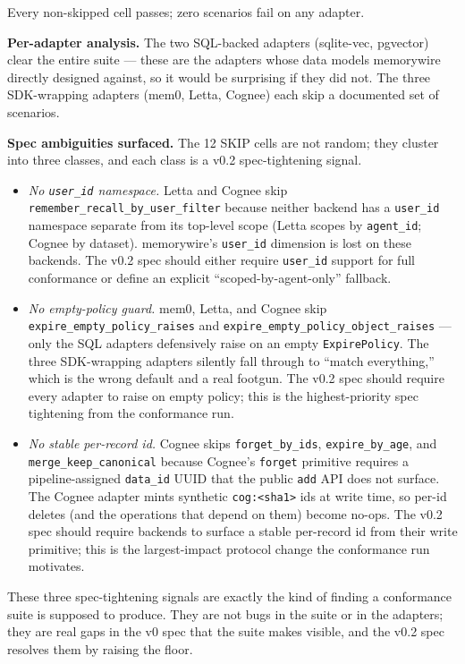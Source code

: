 \documentclass[11pt,letterpaper,twocolumn]{article}
\begin{document}
Every non-skipped cell passes; zero scenarios fail on any adapter.

\textbf{Per-adapter analysis.} The two SQL-backed adapters (sqlite-vec, pgvector) clear the entire suite --- these are the adapters whose data models memorywire directly designed against, so it would be surprising if they did not. The three SDK-wrapping adapters (mem0, Letta, Cognee) each skip a documented set of scenarios.

\textbf{Spec ambiguities surfaced.} The 12 SKIP cells are not random; they cluster into three classes, and each class is a v0.2 spec-tightening signal.

\begin{itemize}[leftmargin=*]
  \item \emph{No \texttt{user\_id} namespace.} Letta and Cognee skip \texttt{remember\_recall\_by\_user\_filter} because neither backend has a \texttt{user\_id} namespace separate from its top-level scope (Letta scopes by \texttt{agent\_id}; Cognee by dataset). memorywire's \texttt{user\_id} dimension is lost on these backends. The v0.2 spec should either require \texttt{user\_id} support for full conformance or define an explicit ``scoped-by-agent-only'' fallback.
  \item \emph{No empty-policy guard.} mem0, Letta, and Cognee skip \texttt{expire\_empty\_policy\_raises} and \texttt{expire\_empty\_policy\_object\_raises} --- only the SQL adapters defensively raise on an empty \texttt{ExpirePolicy}. The three SDK-wrapping adapters silently fall through to ``match everything,'' which is the wrong default and a real footgun. The v0.2 spec should require every adapter to raise on empty policy; this is the highest-priority spec tightening from the conformance run.
  \item \emph{No stable per-record id.} Cognee skips \texttt{forget\_by\_ids}, \texttt{expire\_by\_age}, and \texttt{merge\_keep\_canonical} because Cognee's \texttt{forget} primitive requires a pipeline-assigned \texttt{data\_id} UUID that the public \texttt{add} API does not surface. The Cognee adapter mints synthetic \texttt{cog:<sha1>} ids at write time, so per-id deletes (and the operations that depend on them) become no-ops. The v0.2 spec should require backends to surface a stable per-record id from their write primitive; this is the largest-impact protocol change the conformance run motivates.
\end{itemize}

These three spec-tightening signals are exactly the kind of finding a conformance suite is supposed to produce. They are not bugs in the suite or in the adapters; they are real gaps in the v0 spec that the suite makes visible, and the v0.2 spec resolves them by raising the floor.
\end{document}
